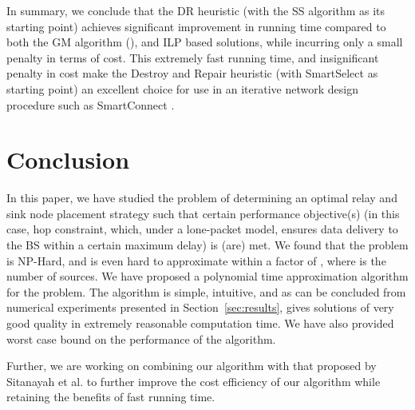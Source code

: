 \documentclass[conference]{IEEEtran}
\begin{document}
In summary, we conclude that the DR heuristic (with the SS algorithm as its starting point) achieves significant improvement in running time compared to both the GM algorithm (\cite{sitanayah}), and ILP based solutions, while incurring only a small penalty in terms of cost. This extremely fast running time, and insignificant penalty in cost make the Destroy and Repair heuristic (with SmartSelect as starting point) an excellent choice for use in an iterative network design procedure such as SmartConnect \cite{smartconnect-paper}.

\section{Conclusion}
\label{sec:conclude}
In this paper, we have studied the problem of determining an optimal relay and sink node placement strategy such that certain performance objective(s) (in this case, hop constraint, which, under a lone-packet model, ensures data delivery to the BS within a certain maximum delay) is (are) met. We found that the problem is NP-Hard, and is even hard to approximate within a factor of , where  is the number of sources. We have proposed a polynomial time approximation algorithm for the problem. The algorithm is simple, intuitive, and as can be concluded from numerical experiments presented in Section~\ref{sec:results}, gives solutions of very good quality in extremely reasonable computation time. We have also provided worst case bound on the performance of the algorithm. 

Further, we are working on combining our algorithm with that proposed by Sitanayah et al. \cite{sitanayah} to further improve the cost efficiency of our algorithm while retaining the benefits of fast running time. 
  


\end{document}

